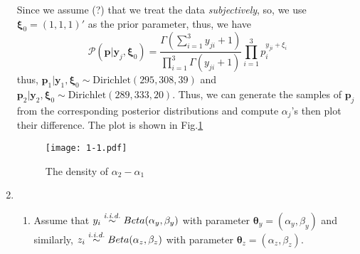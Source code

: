 \documentclass[twoside,11pt]{amsart}
\begin{document}
\begin{enumerate}
  Since we assume (?) that we treat the data {\em subjectively}, so,
  we use $\bm\xi_0 = (1,1,1)'$ as the prior parameter, thus, we have
   \[
    \mathscr P(\bm p|\bm y_j,\bm\xi_0) =
    \frac{\Gamma\left(\sum_{i=1}^3y_{ji} +1\right)}{\prod_{i=1}^3\Gamma(y_{ji}+1)}
  \prod_{i=1}^3p_i^{y_{ji} + \xi_i}
   \]
   thus, $\bm p_1|\bm y_1, \bm\xi_0\sim\text{Dirichlet}(295, 308,
   39)$ and $\bm p_2|\bm y_2, \bm\xi_0\sim\text{Dirichlet}(289, 333,
   20)$. Thus, we can generate the samples of $\bm p_j$ from the
   corresponding posterior distributions and compute $\alpha_j$'s then
   plot their difference. The plot is shown in Fig.\ref{fig:1-1}
   \begin{figure}[h]
        \texttt{[image: 1-1.pdf]}
        \caption{The density of $\alpha_2 - \alpha_1$}\label{fig:1-1}
      \end{figure}
\item
  \begin{enumerate}
  \item
    Assume that $y_i\overset{\text{\em i.i.d.}}{\sim}Beta(\alpha_y,
    \beta_y)$ with parameter $\bm\theta_y = (\alpha_y,
    \beta_y)$ and similarly, $z_i\overset{\text{\em i.i.d.}}{\sim}Beta(\alpha_z,
    \beta_z)$ with parameter $\bm\theta_z = (\alpha_z,
    \beta_z)$.


\end{enumerate}
\end{enumerate}
\end{document}
